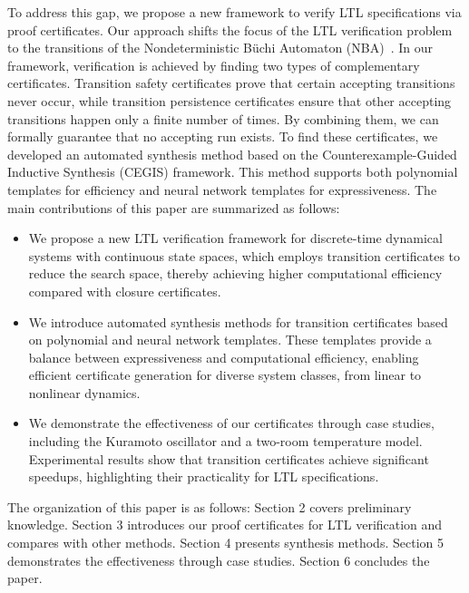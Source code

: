 To address this gap, we propose a new framework to verify LTL specifications via proof certificates. Our approach shifts the focus of the LTL verification problem to the transitions of the Nondeterministic Büchi Automaton (NBA)~\cite{hahn2020reward}. In our framework, verification is achieved by finding two types of complementary certificates. Transition safety certificates prove that certain accepting transitions never occur, while transition persistence certificates ensure that other accepting transitions happen only a finite number of times. By combining them, we can formally guarantee that no accepting run exists. To find these certificates, we developed an automated synthesis method based on the Counterexample-Guided Inductive Synthesis (CEGIS) framework. This method supports both polynomial templates for efficiency and neural network templates for expressiveness. The main contributions of this paper are summarized as follows:
\begin{itemize}

  \item We propose a new LTL verification framework for discrete-time dynamical systems with continuous state spaces, which employs​ transition certificates to reduce the search space, thereby achieving higher computational efficiency compared with​ closure certificates.
  

  \item We introduce automated synthesis methods​ for transition certificates based on polynomial and neural network templates. These templates provide a balance between expressiveness and computational efficiency, enabling efficient certificate generation for diverse system classes, from linear to nonlinear dynamics.
  

  \item We demonstrate the effectiveness​ of our certificates through case studies, including the Kuramoto oscillator and a two-room temperature model. Experimental results show that transition certificates achieve significant speedups, highlighting their practicality for LTL specifications.
\end{itemize}

The organization of this paper is as follows: Section 2 covers preliminary knowledge. Section 3 introduces our proof certificates for LTL verification and compares with other methods. Section 4 presents synthesis methods. Section 5 demonstrates the effectiveness through case studies. Section 6 concludes the paper.


